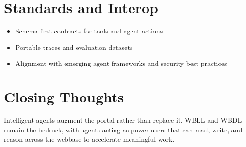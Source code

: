 \section{Standards and Interop}
\begin{itemize}
	\item Schema-first contracts for tools and agent actions
	\item Portable traces and evaluation datasets
	\item Alignment with emerging agent frameworks and security best practices
\end{itemize}

\section{Closing Thoughts}
Intelligent agents augment the portal rather than replace it. WBLL and WBDL remain the bedrock, with agents acting as power users that can read, write, and reason across the webbase to accelerate meaningful work.
